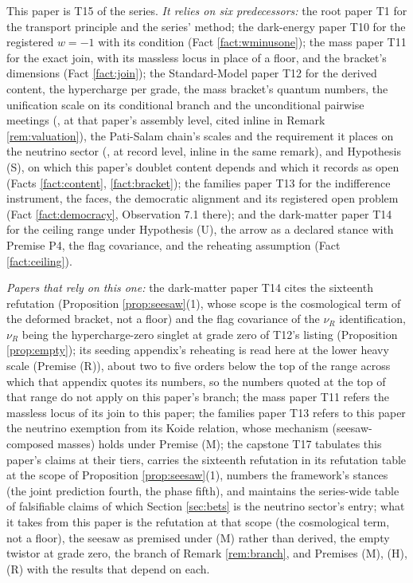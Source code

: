 \documentclass[11pt]{article}
\theoremstyle{definition}
\begin{document}
This paper is T15 of the series. \emph{It relies on six predecessors:} the root paper T1 \cite{ButlerT1} for the transport principle and the series' method; the dark-energy paper T10 \cite{ButlerT10} for the registered $w = -1$ with its condition (Fact \ref{fact:wminusone}); the mass paper T11 \cite{ButlerT11} for the exact join, with its massless locus in place of a floor, and the bracket's dimensions (Fact \ref{fact:join}); the Standard-Model paper T12 \cite{ButlerT12} for the derived content, the hypercharge per grade, the mass bracket's quantum numbers, the unification scale on its conditional branch and the unconditional pairwise meetings (\cite[Prop.~6.2]{ButlerT12}, at that paper's assembly level, cited inline in Remark \ref{rem:valuation}), the Pati-Salam chain's scales and the requirement it places on the neutrino sector (\cite[Props.~10.10, 11.2]{ButlerT12}, at record level, inline in the same remark), and Hypothesis (S), on which this paper's doublet content depends and which it records as open (Facts \ref{fact:content}, \ref{fact:bracket}); the families paper T13 \cite{ButlerT13} for the indifference instrument, the faces, the democratic alignment and its registered open problem (Fact \ref{fact:democracy}, Observation 7.1 there); and the dark-matter paper T14 \cite{ButlerT14} for the ceiling range under Hypothesis (U), the arrow as a declared stance with Premise P4, the flag covariance, and the reheating assumption (Fact \ref{fact:ceiling}).

\emph{Papers that rely on this one:} the dark-matter paper T14 \cite{ButlerT14} cites the sixteenth refutation (Proposition \ref{prop:seesaw}(1), whose scope is the cosmological term of the deformed bracket, not a floor) and the flag covariance of the $\nu_{R}$ identification, $\nu_{R}$ being the hypercharge-zero singlet at grade zero of T12's listing (Proposition \ref{prop:empty}); its seeding appendix's reheating is read here at the lower heavy scale (Premise (R)), about two to five orders below the top of the range across which that appendix quotes its numbers, so the numbers quoted at the top of that range do not apply on this paper's branch; the mass paper T11 \cite{ButlerT11} refers the massless locus of its join to this paper; the families paper T13 \cite{ButlerT13} refers to this paper the neutrino exemption from its Koide relation, whose mechanism (seesaw-composed masses) holds under Premise (M); the capstone T17 \cite{ButlerT17} tabulates this paper's claims at their tiers, carries the sixteenth refutation in its refutation table at the scope of Proposition \ref{prop:seesaw}(1), numbers the framework's stances (the joint prediction fourth, the phase fifth), and maintains the series-wide table of falsifiable claims of which Section \ref{sec:bets} is the neutrino sector's entry; what it takes from this paper is the refutation at that scope (the cosmological term, not a floor), the seesaw as premised under (M) rather than derived, the empty twistor at grade zero, the branch of Remark \ref{rem:branch}, and Premises (M), (H), (R) with the results that depend on each.
\end{document}
